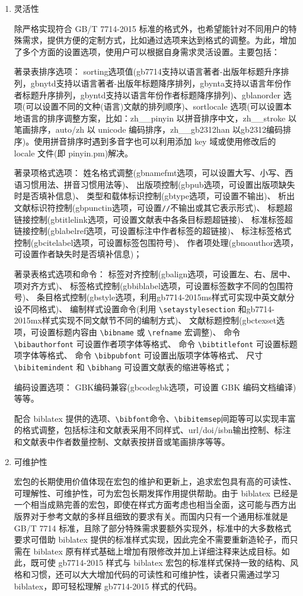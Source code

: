\documentclass[11pt]{article} %
\begin{document}
\begin{enumerate}
  \item 灵活性

除严格实现符合 GB/T 7714-2015 标准的格式外，也希望能针对不同用户的特殊需求，提供方便的定制方式，比如通过选项来达到格式的调整。为此，增加了多个方面的设置选项，使用户可以根据自身需求灵活设置。主要包括：

著录表排序选项：
sorting选项值(gb7714支持以语言著者-出版年标题升序排列，gbnytd支持以语言著者-出版年标题降序排列，gbynta支持以语言年份作者标题升序排列，gbyntd支持以语言年份作者标题降序排列)、gblanorder 选项(可以设置不同的文种(语言)文献的排列顺序)、sortlocale 选项(可以设置本地语言的排序调整方案，比如：zh\_\_pinyin 以拼音排序中文，zh\_\_stroke 以笔画排序，auto/zh 以 unicode 编码排序，zh\_\_gb2312han 以gb2312编码排序)。使用拼音排序时遇到多音字也可以利用添加 key 域或使用修改后的 locale 文件(即 pinyin.pm)解决。


著录项格式选项：
姓名格式调整(gbnamefmt选项，可以设置大写、小写、西语习惯用法、拼音习惯用法等)、
出版项控制(gbpub选项，可设置出版项缺失时是否填补信息)、
类型和载体标识控制(gbtype选项，可设置不输出)、
析出文献标识符控制(gbpunctin选项，可设置\texttt{//}不输出或其它表示形式)、
标题超链接控制(gbtitlelink选项，可设置文献表中各条目标题超链接)、
标准标签超链接控制(gblabelref选项，可设置标注中作者标签的超链接)、
标注标签格式控制(gbcitelabel选项，可设置标签包围符号)、
作者项处理(gbnoauthor选项，可设置作者缺失时是否填补信息)；

著录表格式选项和命令：
标签对齐控制(gbalign选项，可设置左、右、居中、项对齐方式)、
标签格式控制(gbbiblabel选项，可设置标签数字不同的包围符号)、
条目格式控制(gbstyle选项，利用gb7714-2015ms样式可实现中英文献分设不同格式)、
编制样式设置命令(利用 \verb|\setaystylesection| 和gb7714-2015mx样式实现不同文献节不同的编制方式)、
文献标题控制(gbctexset选项，可设置标题内容由 \verb|\bibname| 或 \verb|\refname| 宏调整)、
命令 \verb|\bibauthorfont| 可设置作者项字体等格式、
命令 \verb|\bibtitlefont| 可设置标题项字体等格式、
命令 \verb|\bibpubfont| 可设置出版项字体等格式、
尺寸 \verb|\bibitemindent| 和 \verb|\bibhang| 可设置文献表的缩进等格式；

编码设置选项：
GBK编码兼容(gbcodegbk选项，可设置 GBK 编码文档编译)等等。

配合 biblatex 提供的选项、\verb|\bibfont|命令、\verb|\bibitemsep|间距等可以实现丰富的格式调整，包括标注和文献表采用不同样式、url/doi/isbn输出控制、标注和文献表中作者数量控制、文献表按拼音或笔画排序等等。


  \item 可维护性

宏包的长期使用价值体现在宏包的维护和更新上，追求宏包具有高的可读性、可理解性、可维护性，可为宏包长期发挥作用提供帮助。由于 biblatex 已经是一个相当成熟完善的宏包，即使在样式方面考虑也相当全面，这可能与西方出版界对于参考文献的多样且细致的要求有关。而国内只有一个通用标准就是 GB/T 7714 标准，且除了部分特殊需求要额外实现外，标准中的大多数格式要求可借助 biblatex 提供的标准样式实现，因此完全不需要重新造轮子，而只需在 biblatex 原有样式基础上增加有限修改并加上详细注释来达成目标。如此，既可使 gb7714-2015 样式与 biblatex 宏包的标准样式保持一致的结构、风格和习惯，还可以大大增加代码的可读性和可维护性，读者只需通过学习 biblatex，即可轻松理解 gb7714-2015 样式的代码。



\end{enumerate}
\end{document}
